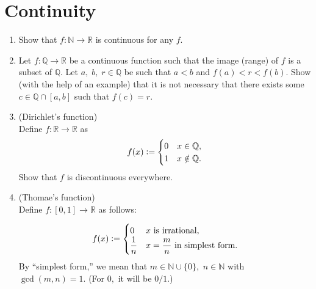 \documentclass{article}
\begin{document}
\section{Continuity}
\begin{enumerate}
	\item Show that $f:\mathbb{N}\to\mathbb{R}$ is continuous for any $f.$
	\item Let $f:\mathbb{Q} \to \mathbb{R}$ be a continuous function such that the image (range) of $f$ is a subset of $\mathbb{Q}.$ Let $a,\;b,\;r\in \mathbb{Q}$ be such that $a < b$ and $f(a) < r < f(b).$ Show (with the help of an example) that it is not necessary that there exists some $c \in \mathbb{Q}\cap[a, b]$ such that $f(c) = r.$
	\item (Dirichlet's function)\\
	Define $f:\mathbb{R}\to\mathbb{R}$ as
	\begin{equation*} 
		f(x) \vcentcolon= \begin{cases}
			0 & x \in \mathbb{Q},\\
			1 & x \notin \mathbb{Q}.
		\end{cases}
	\end{equation*}
	Show that $f$ is discontinuous everywhere.
	\item (Thomae's function) \\
	Define $f:[0, 1] \to \mathbb{R}$ as follows:

	\begin{equation*} 
		f(x) \vcentcolon= \begin{cases}
			0 & x \text{ is irrational},\\
			\dfrac{1}{n} & x = \dfrac{m}{n} \text{ in simplest form}.
		\end{cases}
	\end{equation*}
	By ``simplest form,'' we mean that $m \in \mathbb{N}\cup\{0\},$ $n \in \mathbb{N}$ with $\gcd(m, n) = 1.$ (For $0,$ it will be $0/1.$)


\end{enumerate}
\end{document}
